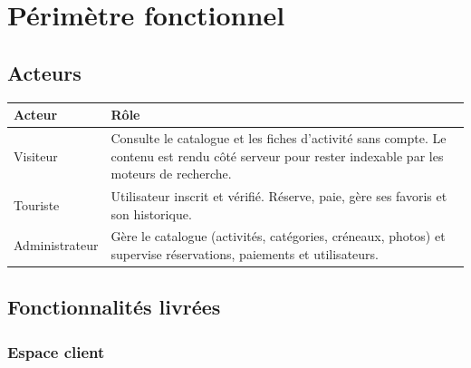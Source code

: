 \documentclass[11pt,a4paper]{report}
\begin{document}
\chapter{Périmètre fonctionnel}

\section{Acteurs}

\begin{longtable}{@{}p{3cm}p{11.5cm}@{}}
\toprule
\textbf{Acteur} & \textbf{Rôle} \\
\midrule
\endhead
Visiteur & Consulte le catalogue et les fiches d'activité sans compte. Le
contenu est rendu côté serveur pour rester indexable par les moteurs de
recherche. \\
\addlinespace
Touriste & Utilisateur inscrit et vérifié. Réserve, paie, gère ses favoris et
son historique. \\
\addlinespace
Administrateur & Gère le catalogue (activités, catégories, créneaux, photos) et
supervise réservations, paiements et utilisateurs. \\
\bottomrule
\end{longtable}

\section{Fonctionnalités livrées}

\subsection{Espace client}
\end{document}
